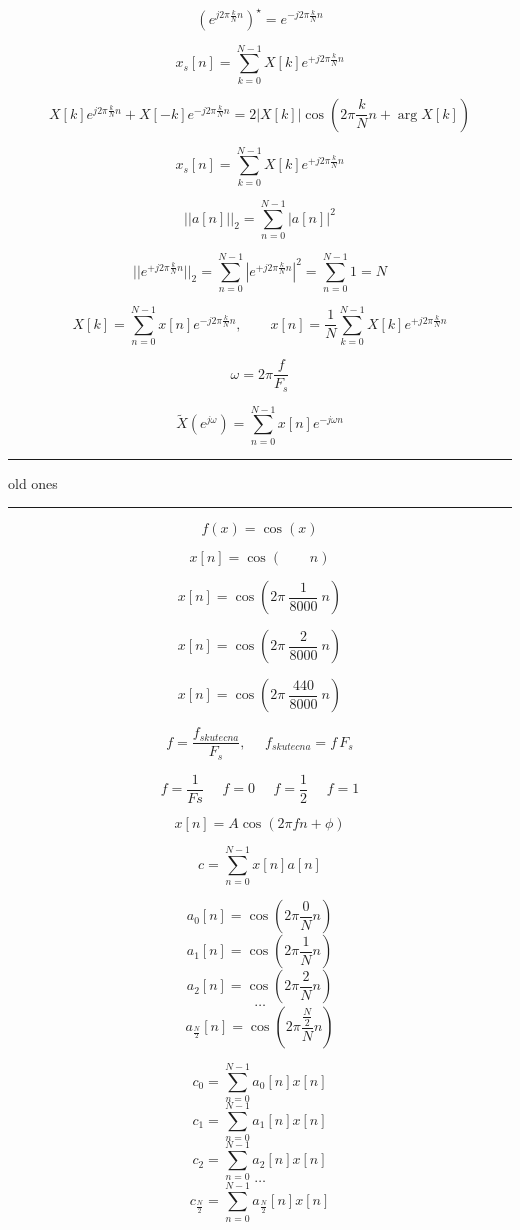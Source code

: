 \documentclass{article}[12pt]
\def\ejo{e^{j\omega}}
\begin{document}
$$ \left( e^{j 2 \pi \frac{k}{N} n} \right )^\star =  e^{-j 2 \pi
   \frac{k}{N} n} $$

$$x_s[n] = \sum_{k=0}^{N-1} X[k] e^{+j 2 \pi \frac{k}{N} n}$$

$$X[k] e^{j 2 \pi \frac{k}{N} n} + X[-k] e^{-j 2 \pi \frac{k}{N}
  n} = 2 |X[k]| \cos \left (2 \pi \frac{k}{N} n +
\arg X[k] \right ) $$

$$x_s[n] = \sum_{k=0}^{N-1} X[k] e^{+j 2 \pi \frac{k}{N} n}$$

$$||a[n]||_2 = \sum_{n=0}^{N-1} |a[n]|^2$$

$$||e^{+j 2 \pi \frac{k}{N} n}||_2 = \sum_{n=0}^{N-1} |e^{+j 2 \pi
  \frac{k}{N} n}|^2 =  \sum_{n=0}^{N-1} 1 = N $$

$$X[k]= \sum_{n=0}^{N-1}x[n] e^{-j 2 \pi \frac{k}{N}
  n},~~~~~~~~~
x[n] = \frac{1}{N}\sum_{k=0}^{N-1} X[k] e^{+j 2 \pi \frac{k}{N} n} $$

$$\omega = 2 \pi \frac{f}{F_s}$$

$$\tilde{X}(\ejo) = \sum_{n = 0}^{N-1} x[n] e^{-j\omega n}$$ 




\hrule 

old ones 

\hrule 

$$f(x) = \cos (x) $$

$$x[n] = \cos(~~~~~~~~~ n) $$

$$x[n] = \cos(2\pi~\frac{1}{8000}~ n) $$

$$x[n] = \cos(2\pi~\frac{2}{8000}~ n) $$

$$x[n] = \cos(2\pi~\frac{440}{8000}~ n) $$

$$f = \frac{f_{skutecna}}{F_s}, ~~~~~~ f_{skutecna} = f \,F_s$$

$$f = \frac{1}{Fs}~~~~~~f = 0~~~~~~f = \frac{1}{2}~~~~~~f = 1$$

$$x[n] = A \cos(2 \pi f n + \phi)$$

$$c = \sum_{n=0}^{N-1} x[n] a[n]$$

$$a_0[n] = \cos (2 \pi \frac{0}{N} n)$$
$$a_1[n] = \cos (2 \pi \frac{1}{N} n)$$
$$a_2[n] = \cos (2 \pi \frac{2}{N} n)$$
$$\ldots$$
$$a_{\frac{N}{2}}[n] = \cos (2 \pi \frac{\frac{N}{2}}{N} n)$$
 
$$c_0 = \sum_{n=0}^{N-1} a_0[n] x[n]$$
$$c_1 = \sum_{n=0}^{N-1} a_1[n] x[n]$$
$$c_2 = \sum_{n=0}^{N-1} a_2[n] x[n]$$
$$\ldots$$
$$c_{\frac{N}{2}} = \sum_{n=0}^{N-1} a_{\frac{N}{2}}[n] x[n]$$
\end{document}
